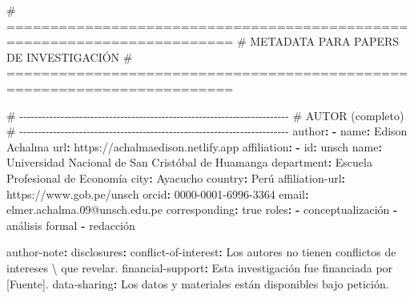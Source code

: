 \documentclass[
  doc,
  floatsintext,
  longtable,
  a4paper,
  nolmodern,
  notxfonts,
  notimes,
  12pt,
  colorlinks=true,linkcolor=blue,citecolor=blue,urlcolor=blue]{apa7}
\newenvironment{Shaded}{\begin{snugshade}}{\end{snugshade}}
\newcommand{\AttributeTok}[1]{\textcolor[rgb]{0.40,0.45,0.13}{#1}}
\newcommand{\CharTok}[1]{\textcolor[rgb]{0.13,0.47,0.30}{#1}}
\newcommand{\CommentTok}[1]{\textcolor[rgb]{0.37,0.37,0.37}{#1}}
\newcommand{\FunctionTok}[1]{\textcolor[rgb]{0.28,0.35,0.67}{#1}}
\newcommand{\KeywordTok}[1]{\textcolor[rgb]{0.00,0.23,0.31}{\textbf{#1}}}
\begin{document}
\begin{Shaded}
\begin{Highlighting}[]
\CommentTok{\# ========================================================================}
\CommentTok{\# METADATA PARA PAPERS DE INVESTIGACIÓN}
\CommentTok{\# ========================================================================}

\CommentTok{\# {-}{-}{-}{-}{-}{-}{-}{-}{-}{-}{-}{-}{-}{-}{-}{-}{-}{-}{-}{-}{-}{-}{-}{-}{-}{-}{-}{-}{-}{-}{-}{-}{-}{-}{-}{-}{-}{-}{-}{-}{-}{-}{-}{-}{-}{-}{-}{-}{-}{-}{-}{-}{-}{-}{-}{-}{-}{-}{-}{-}{-}{-}{-}{-}{-}{-}{-}{-}{-}{-}{-}{-}}
\CommentTok{\# AUTOR (completo)}
\CommentTok{\# {-}{-}{-}{-}{-}{-}{-}{-}{-}{-}{-}{-}{-}{-}{-}{-}{-}{-}{-}{-}{-}{-}{-}{-}{-}{-}{-}{-}{-}{-}{-}{-}{-}{-}{-}{-}{-}{-}{-}{-}{-}{-}{-}{-}{-}{-}{-}{-}{-}{-}{-}{-}{-}{-}{-}{-}{-}{-}{-}{-}{-}{-}{-}{-}{-}{-}{-}{-}{-}{-}{-}{-}}
\FunctionTok{author}\KeywordTok{:}
\AttributeTok{  }\KeywordTok{{-}}\AttributeTok{ }\FunctionTok{name}\KeywordTok{:}\AttributeTok{ Edison Achalma}
\AttributeTok{    }\FunctionTok{url}\KeywordTok{:}\AttributeTok{ https://achalmaedison.netlify.app}
\AttributeTok{    }\FunctionTok{affiliation}\KeywordTok{:}
\AttributeTok{      }\KeywordTok{{-}}\AttributeTok{ }\FunctionTok{id}\KeywordTok{:}\AttributeTok{ unsch}
\AttributeTok{        }\FunctionTok{name}\KeywordTok{:}\AttributeTok{ Universidad Nacional de San Cristóbal de Huamanga}
\AttributeTok{        }\FunctionTok{department}\KeywordTok{:}\AttributeTok{ Escuela Profesional de Economía}
\AttributeTok{        }\FunctionTok{city}\KeywordTok{:}\AttributeTok{ Ayacucho}
\AttributeTok{        }\FunctionTok{country}\KeywordTok{:}\AttributeTok{ Perú}
\AttributeTok{    }\FunctionTok{affiliation{-}url}\KeywordTok{:}\AttributeTok{ https://www.gob.pe/unsch}
\AttributeTok{    }\FunctionTok{orcid}\KeywordTok{:}\AttributeTok{ 0000{-}0001{-}6996{-}3364}
\AttributeTok{    }\FunctionTok{email}\KeywordTok{:}\AttributeTok{ elmer.achalma.09@unsch.edu.pe}
\AttributeTok{    }\FunctionTok{corresponding}\KeywordTok{:}\AttributeTok{ }\CharTok{true}
\AttributeTok{    }\FunctionTok{roles}\KeywordTok{:}
\AttributeTok{      }\KeywordTok{{-}}\AttributeTok{ conceptualización}
\AttributeTok{      }\KeywordTok{{-}}\AttributeTok{ análisis formal}
\AttributeTok{      }\KeywordTok{{-}}\AttributeTok{ redacción}

\FunctionTok{author{-}note}\KeywordTok{:}
\AttributeTok{  }\FunctionTok{disclosures}\KeywordTok{:}
\AttributeTok{    }\FunctionTok{conflict{-}of{-}interest}\KeywordTok{:}\AttributeTok{ Los autores no tienen conflictos de intereses \textbackslash{} }
\AttributeTok{    que revelar.}
\AttributeTok{    }\FunctionTok{financial{-}support}\KeywordTok{:}\AttributeTok{ Esta investigación fue financiada por [Fuente].}
\AttributeTok{    }\FunctionTok{data{-}sharing}\KeywordTok{:}\AttributeTok{ Los datos y materiales están disponibles bajo petición.}


\end{Highlighting}
\end{Shaded}
\end{document}

